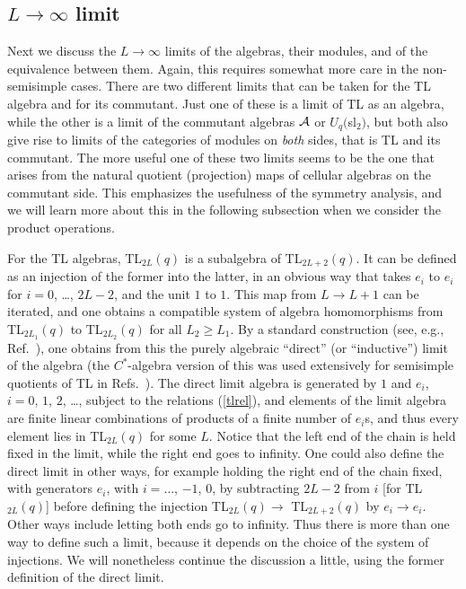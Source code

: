 \documentclass[twocolumn,floats,pra]{revtex4}
\def \cA {{\cal A}}
\begin{document}
\subsection{$L\to\infty$ limit}

Next we discuss the $L\to\infty$ limits of the algebras, their
modules, and of the equivalence between them. Again, this requires
somewhat more care in the non-semisimple cases. There are two
different limits that can be taken for the TL algebra and for its
commutant. Just one of these is a limit of TL as an algebra, while
the other is a limit of the commutant algebras $\cA$ or
$U_q($sl$_2)$, but both also give rise to limits of the categories
of modules on {\em both} sides, that is TL and its commutant. The
more useful one of these two limits seems to be the one that
arises from the natural quotient (projection) maps of cellular
algebras on the commutant side. This emphasizes the usefulness of
the symmetry analysis, and we will learn more about this in the
following subsection when we consider the product operations.

For the TL algebras, TL$_{2L}(q)$ is a subalgebra of
TL$_{2L+2}(q)$. It can be defined as an injection of the former
into the latter, in an obvious way that takes $e_i$ to $e_i$ for
$i=0$, \ldots, $2L-2$, and the unit $1$ to $1$. This map from
$L\to L+1$ can be iterated, and one obtains a compatible system of
algebra homomorphisms from TL$_{2L_1}(q)$ to TL$_{2L_2}(q)$ for
all $L_2\geq L_1$. By a standard construction (see, e.g., Ref.\
\cite{wo}), one obtains from this the purely algebraic ``direct''
(or ``inductive'') limit of the algebra (the $C^*$-algebra version
of this was used extensively for semisimple quotients of TL in
Refs.\ \cite{jones1,ghj}). The direct limit algebra is generated
by $1$ and $e_i$, $i=0$, $1$, $2$, \ldots, subject to the
relations (\ref{tlrel}), and elements of the limit algebra are
finite linear combinations of products of a finite number of
$e_i$s, and thus every element lies in TL$_{2L}(q)$ for some $L$.
Notice that the left end of the chain is held fixed in the limit,
while the right end goes to infinity. One could also define the
direct limit in other ways, for example holding the right end of
the chain fixed, with generators $e_i$, with $i=\ldots$, $-1$,
$0$, by subtracting $2L-2$ from $i$ [for TL$_{2L}(q)$] before
defining the injection TL$_{2L}(q)\rightarrow$ TL$_{2L+2}(q)$ by
$e_i \rightarrow e_i$. Other ways include letting both ends go to
infinity. Thus there is more than one way to define such a limit,
because it depends on the choice of the system of injections. We
will nonetheless continue the discussion a little, using the
former definition of the direct limit.
\end{document}
